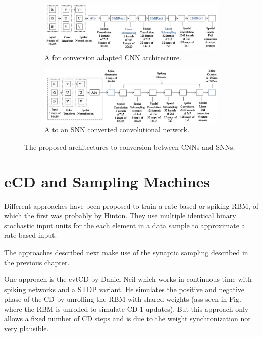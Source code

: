 \begin{figure}
	\centering
	\begin{subfigure}[t]{.50\textwidth}
  		\centering
  		\includegraphics[width=.9\linewidth]{imgs/cnn_snn_conv1.jpg}
  		\caption{A for conversion adapted CNN architecture.}
  		\label{fig:sub1}
	\end{subfigure}%
	\begin{subfigure}[t]{.50\textwidth}
  		\centering
  		\includegraphics[width=.9\linewidth]{imgs/cnn_snn_conv2.jpg}
  		\caption{A to an SNN converted convolutional network.}
  		\label{fig:sub2}
	\end{subfigure}
	\caption{The proposed architectures to conversion between CNNs and SNNs. }
\end{figure}

\section{eCD and Sampling Machines}

Different approaches have been proposed to train a rate-based or spiking RBM, of which the first was probably by Hinton.
They use multiple identical binary stochastic input units for the each element in a data sample to approximate a rate based input.

The approaches described next make use of the synaptic sampling described in the previous chapter.

One approach is the evtCD by Daniel Neil which works in continuous time with spiking networks and a STDP variant.
He simulates the positive and negative phase of the CD by unrolling the RBM with shared weights (ass seen in Fig. where the RBM is unrolled to simulate CD-1 updates). 
But this approach only allows a fixed number of CD steps and is due to the weight synchronization not very plausible.

